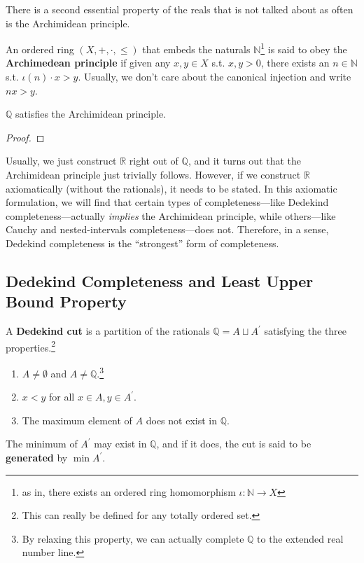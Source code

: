   There is a second essential property of the reals that is not talked about as often is the Archimidean principle. 

  \begin{definition}
    An ordered ring $(X, +, \cdot, \leq)$ that embeds the naturals $\mathbb{N}$\footnote{as in, there exists an ordered ring homomorphism $\iota: \mathbb{N} \rightarrow X$} is said to obey the \textbf{Archimedean principle} if given any $x, y \in X$ s.t. $x, y > 0$, there exists an $n \in \mathbb{N}$ s.t. $\iota(n) \cdot x > y$. Usually, we don't care about the canonical injection and write $nx > y$. 
  \end{definition} 
  
  \begin{lemma} 
    $\mathbb{Q}$ satisfies the Archimidean principle. 
  \end{lemma}
  \begin{proof}
    
  \end{proof}

  Usually, we just construct $\mathbb{R}$ right out of $\mathbb{Q}$, and it turns out that the Archimidean principle just trivially follows. However, if we construct $\mathbb{R}$ axiomatically (without the rationals), it needs to be stated. In this axiomatic formulation, we will find that certain types of completeness---like Dedekind completeness---actually \textit{implies} the Archimidean principle, while others---like Cauchy and nested-intervals completeness---does not. Therefore, in a sense, Dedekind completeness is the ``strongest'' form of completeness. 

\subsection{Dedekind Completeness and Least Upper Bound Property} 

  \begin{definition} 
    A \textbf{Dedekind cut} is a partition of the rationals $\mathbb{Q} = A \sqcup A^\prime$ satisfying the three properties.\footnote{This can really be defined for any totally ordered set. } 
    \begin{enumerate}
      \item $A \neq \emptyset$ and $A \neq \mathbb{Q}$.\footnote{By relaxing this property, we can actually complete $\mathbb{Q}$ to the extended real number line. }
      \item $x < y$ for all $x \in A, y \in A^\prime$. 
      \item The maximum element of $A$ does not exist in $\mathbb{Q}$. 
    \end{enumerate}
    The minimum of $A^\prime$ may exist in $\mathbb{Q}$, and if it does, the cut is said to be \textbf{generated} by $\min A^\prime$. 
  \end{definition}

